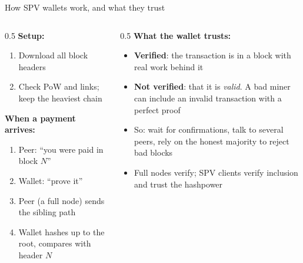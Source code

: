 \ifdefined\PRESENTATION\else\PassOptionsToClass{handout}{beamer}\fi\documentclass[aspectratio=169, lualatex]{beamer}
\begin{document}
\begin{frame}{How SPV wallets work, and what they trust}
	\begin{columns}[c]
		\begin{column}{0.5\textwidth}
			\textbf{Setup:}
			\begin{enumerate}
				\item Download all block headers
				\item Check PoW and links; keep the heaviest chain
			\end{enumerate}
			\textbf{When a payment arrives:}
			\begin{enumerate}
				\item Peer: ``you were paid in block $N$''
				\item Wallet: ``prove it''
				\item Peer (a full node) sends the sibling path
				\item Wallet hashes up to the root, compares with header $N$
			\end{enumerate}
		\end{column}
		\begin{column}{0.5\textwidth}
			\textbf{What the wallet trusts:}
			\begin{itemize}
				\item \textbf{Verified}: the transaction is in a block with real work behind it
				\item \textbf{Not verified}: that it is \emph{valid}. A bad miner can include an invalid transaction with a perfect proof
				\item So: wait for confirmations, talk to several peers, rely on the honest majority to reject bad blocks
				\item Full nodes verify; SPV clients verify inclusion and trust the hashpower
			\end{itemize}
		\end{column}
	\end{columns}
\end{frame}
\end{document}
